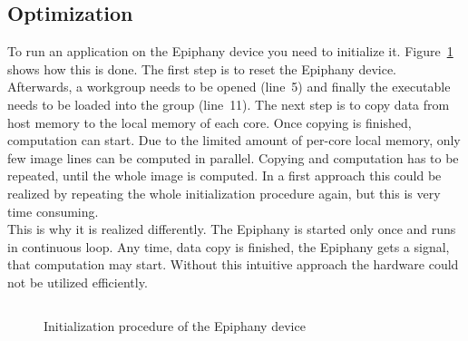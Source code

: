 \documentclass[american, hauptseminar, twoside]{zihpub}
\begin{document}
		\subsection{Optimization}
		\label{sec:bandwidth}
					To run an application on the Epiphany device you need to initialize it. Figure~\ref{code:init} shows how this is done. The first step is to reset the Epiphany device. Afterwards, a workgroup needs to be opened (line~5) and finally the executable needs to be loaded into the group (line~11). The next step is to copy data from host memory to the local memory of each core. Once copying is finished, computation can start. Due to the limited amount of per-core local memory, only few image lines can be computed in parallel. Copying and computation has to be repeated, until the whole image is computed. In a first approach this could be realized by repeating the whole initialization procedure again, but this is very time consuming.
					\\
					This is why it is realized differently. The Epiphany is started only once and runs in continuous loop. Any time, data copy is finished, the Epiphany gets a signal, that computation may start. Without this intuitive approach the hardware could not be utilized efficiently.
					\begin{figure}[h]
						\inputminted[bgcolor=codebg,
						linenos=true,
						frame=lines,
						numbersep=5pt,
						fontsize=\footnotesize,
						breaklines=true,
						tabsize=4]{c}{code/init.c}
						\caption{Initialization procedure of the Epiphany device}
						\label{code:init}
					\end{figure}
\end{document}
